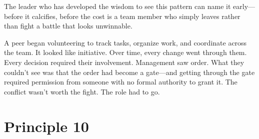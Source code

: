 The leader who has developed the wisdom to see this pattern can name it
early---before it calcifies, before the cost is a team member who simply
leaves rather than fight a battle that looks unwinnable.

\begin{storybox}
A peer began volunteering to track tasks, organize work, and coordinate
across the team. It looked like initiative. Over time, every change
went through them. Every decision required their involvement.
Management saw order. What they couldn't see was that the order had
become a gate---and getting through the gate required permission from
someone with no formal authority to grant it. The conflict wasn't
worth the fight. The role had to go.
\end{storybox}

\section{Principle 10}


